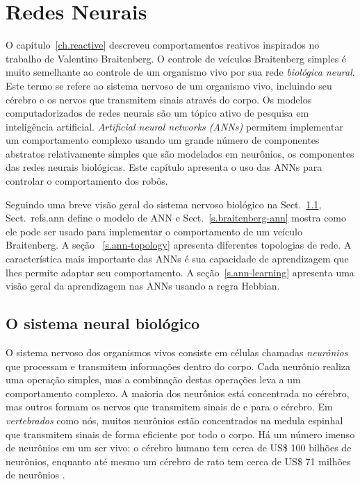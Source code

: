 
\chapter{Redes Neurais}\label{ch.neural}

O capítulo~\ref{ch.reactive} descreveu comportamentos reativos inspirados no trabalho de Valentino Braitenberg. O controle de veículos Braitenberg simples é muito semelhante ao controle de um organismo vivo por sua rede \emph{biológica neural}. Este termo se refere ao sistema nervoso de um organismo vivo, incluindo seu cérebro e os nervos que transmitem sinais através do corpo. Os modelos computadorizados de redes neurais são um tópico ativo de pesquisa em inteligência artificial. \emph{Artificial neural networks (ANNs)} permitem implementar um comportamento complexo usando um grande número de componentes abstratos relativamente simples que são modelados em neurônios, os componentes das redes neurais biológicas. Este capítulo apresenta o uso das ANNs para controlar o comportamento dos robôs.

Seguindo uma breve visão geral do sistema nervoso biológico na Sect.~\ref{s.bio-nn}, Sect.~ref{s.ann} define o modelo de ANN e Sect.~\ref{s.braitenberg-ann} mostra como ele pode ser usado para implementar o comportamento de um veículo Braitenberg. A seção ~\ref{s.ann-topology} apresenta diferentes topologias de rede. A característica mais importante das ANNs é sua capacidade de aprendizagem que lhes permite adaptar seu comportamento. A seção~\ref{s.ann-learning} apresenta uma visão geral da aprendizagem nas ANNs usando a regra Hebbian.

\section{O sistema neural biológico}\label{s.bio-nn}

O sistema nervoso dos organismos vivos consiste em células chamadas \emph{neurônios} que processam e transmitem informações dentro do corpo. Cada neurônio realiza uma operação simples, mas a combinação destas operações leva a um comportamento complexo. A maioria dos neurônios está concentrada no cérebro, mas outros formam os nervos que transmitem sinais de e para o cérebro. Em \emph{vertebrados} como nós, muitos neurônios estão concentrados na medula espinhal que transmitem sinais de forma eficiente por todo o corpo. Há um número imenso de neurônios em um ser vivo: o cérebro humano tem cerca de US\$ 100 bilhões de neurônios, enquanto até mesmo um cérebro de rato tem cerca de US\$ 71 milhões de neurônios \cite{herculano2009human}. 

